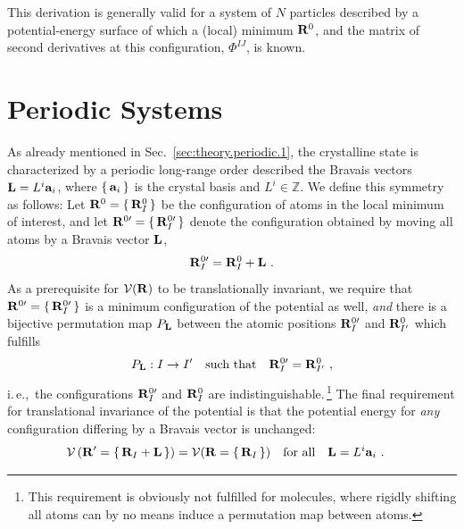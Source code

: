 This derivation is generally valid for a system of $N$ particles described by a potential-energy surface of which a (local) minimum ${\bf R}^0$, and the matrix of second derivatives at this configuration, $\Phi^{IJ}$, is known.

\section{Periodic Systems}
As already mentioned in Sec.~\ref{sec:theory.periodic.1}, the crystalline state is characterized by a periodic long-range order described the Bravais vectors ${\bf L} = L^i {\bf a}_i$, where $\set{{\bf a}_i}$ is the crystal basis and $L^i \in \mathds Z$.
We define this symmetry as follows:
Let ${\bf R}^0 = \set{{\bf R}_I^0}$ be the configuration of atoms in the local minimum of interest, and let ${\bf R}^{0 \prime} = \set{{\bf R}^{0 \prime}_{I}}$ denote the configuration obtained by moving all atoms by a Bravais vector ${\bf L}$,
\begin{align}
	{\bf R}^{0 \prime}_{I} = {\bf R}^0_{I} + {\bf L}~.
	\label{eq:RI'}
\end{align}
As a prerequisite for $\mathcal V ({\bf R})$ to be translationally invariant, we require that ${\bf R}^{0 \prime} = \set{{\bf R}^{0 \prime}_{I}}$ is a minimum configuration of the potential as well, \emph{and} there is a bijective permutation map $P_{\bf L}$ between the atomic positions ${\bf R}^{0 \prime}_{I}$ and ${\bf R}^{0}_{I'}$ which fulfills
\begin{align}
	P_{\bf L} : I \to I' \quad\text{such that}\quad
	{\bf R}^{0 \prime}_{I}
		= {\bf R}^{0}_{I'}~,
	\label{eq:translation.permutation}
\end{align}
i.\,e.,~the configurations ${\bf R}^{0 \prime}_{I}$ and ${\bf R}^{0}_{I}$ are indistinguishable.\,\footnote{This requirement is obviously not fulfilled for molecules, where rigidly shifting all atoms can by no means induce a permutation map between atoms.} 
The final requirement for translational invariance of the potential is that the potential energy for \emph{any} configuration differing by a Bravais vector is unchanged:
\begin{align}
	\mathcal{V} \left( {\bf R}' = \set{{\bf R}_{I} + {\bf L}} \right)
	&= \mathcal{V}({\bf R} = \set{{\bf R}_{I}} ) 
	\quad\text{for all}\quad {\bf L} = L^i {\bf a}_i~.
	\label{eq:inv.V}
\end{align}

